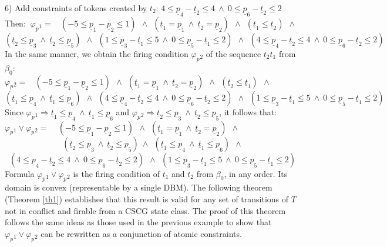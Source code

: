 \documentclass[submission,copyright,creativecommons]{eptcs}
\numberwithin{equation}{section}
\begin{document}
6) Add constraints of tokens created by $t_2$: $ 4 \leq \underline{p}_4 - \underline{t}_2 \leq 4 \ \wedge \ 0 \leq \underline{p}_6 - \underline{t}_2 \leq 2$\\
Then: $ \ \varphi_p{_1} = \  \ \ \ (-5 \leq \underline{p}_1 - \underline{p}_2 \leq 1) \ \ \wedge \ \ (\underline{t}_1 = \underline{p}_1 \  \wedge \ \underline{t}_2 = \underline{p}_2) \ \ \wedge \ \  (\underline{t}_1 \leq \underline{t}_2) \ \ \wedge $
 $$ (\underline{t}_2 \leq \underline{p}_3 \ \wedge \ \underline{t}_2 \leq \underline{p}_5) \ \ \wedge  \ \ (1 \leq \underline{p}_3 - \underline{t}_1 \leq 5 \ \wedge \ 0 \leq \underline{p}_5 - \underline{t}_1 \leq 2) \ \ \wedge \ \ (4 \leq \underline{p}_4 - \underline{t}_2 \leq 4 \ \wedge \ 0 \leq \underline{p}_6 - \underline{t}_2 \leq 2)$$
In the same manner, we obtain the firing condition $\varphi_p{_2}$ of the sequence $t_2t_1$ from $\beta_0$: \\
$\varphi_p{_2} = \ \ \ \ (-5 \leq \underline{p}_1 - \underline{p}_2 \leq 1) \ \ \wedge \ \ (\underline{t}_1 = \underline{p}_1 \  \wedge \  \underline{t}_2 = \underline{p}_2) \ \ \wedge \ \ (\underline{t}_2 \leq \underline{t}_1) \ \ \wedge $
$$ (\underline{t}_1 \leq \underline{p}_4  \ \wedge \ \underline{t}_1 \leq \underline{p}_6 ) \ \ \wedge \ \ (4 \leq \underline{p}_4 - \underline{t}_2 \leq 4 \ \wedge \ 0 \leq \underline{p}_6 - \underline{t}_2 \leq 2)  \ \ \wedge \ \ (1 \leq \underline{p}_3 - \underline{t}_1 \leq 5 \ \wedge \ 0 \leq \underline{p}_5 - \underline{t}_1 \leq 2) $$
  Since $\varphi_p{_1} \Rightarrow   \underline{t}_1 \leq \underline{p}_4 \ \wedge \ \underline{t}_1 \leq \underline{p}_6$ and  $\varphi_p{_2} \Rightarrow  \underline{t}_2 \leq \underline{p}_3 \ \wedge \ \underline{t}_2 \leq \underline{p}_5$, it follows that:\\
$\varphi_p{_1} \vee \varphi_p{_2} = \ \ \ \ \ (-5 \leq \underline{p}_1 - \underline{p}_2 \leq 1) \ \ \wedge \ \ (\underline{t}_1 = \underline{p}_1 \  \wedge  \  \underline{t}_2 = \underline{p}_2) \ \ \wedge $ $$ (\underline{t}_2 \leq \underline{p}_3 \ \wedge \ \underline{t}_2 \leq \underline{p}_5) \ \wedge  \ \ (\underline{t}_1 \leq \underline{p}_4 \ \wedge \ \underline{t}_1 \leq \underline{p}_6) \ \ \wedge $$ $$(4 \leq \underline{p}_4 - \underline{t}_2 \leq 4 \ \wedge \ 0 \leq \underline{p}_6 - \underline{t}_2 \leq 2) \ \ \wedge \ \ (1 \leq \underline{p}_3 - \underline{t}_1 \leq 5 \ \wedge \ 0 \leq \underline{p}_5 - \underline{t}_1 \leq 2) $$
Formula $\varphi_p{_1} \vee \varphi_p{_2}$ is the firing condition of $t_1$ and $t_2$ from $\beta_0$, in any order. Its domain is convex (representable by a single DBM).
The following theorem (Theorem \ref{th1}) establishes that this result is valid for any set of transitions of $T$ not in conflict and firable from a CSCG state class. The proof of this theorem follows the same ideas as those used in the previous example to show that $\varphi_p{_1} \vee \varphi_p{_2}$ can be rewritten as a conjunction of atomic constraints.
\end{document}
